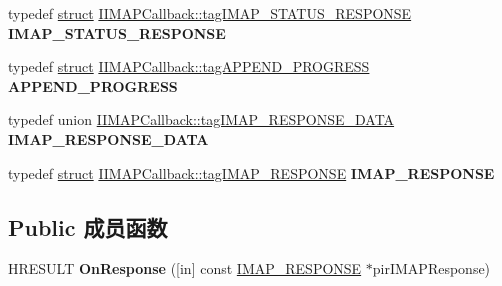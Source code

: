 \begin{DoxyCompactItemize}
\mbox{\label{interface_i_i_m_a_p_callback_aad87226fb7e9bc2c5a030ae23732c575}} 
typedef \hyperlink{interfacestruct}{struct} \hyperlink{struct_i_i_m_a_p_callback_1_1tag_i_m_a_p___s_t_a_t_u_s___r_e_s_p_o_n_s_e}{I\+I\+M\+A\+P\+Callback\+::tag\+I\+M\+A\+P\+\_\+\+S\+T\+A\+T\+U\+S\+\_\+\+R\+E\+S\+P\+O\+N\+SE} {\bfseries I\+M\+A\+P\+\_\+\+S\+T\+A\+T\+U\+S\+\_\+\+R\+E\+S\+P\+O\+N\+SE}
\item 
\mbox{\label{interface_i_i_m_a_p_callback_adf295f4f017536fabf12b58984b9ada8}} 
typedef \hyperlink{interfacestruct}{struct} \hyperlink{struct_i_i_m_a_p_callback_1_1tag_a_p_p_e_n_d___p_r_o_g_r_e_s_s}{I\+I\+M\+A\+P\+Callback\+::tag\+A\+P\+P\+E\+N\+D\+\_\+\+P\+R\+O\+G\+R\+E\+SS} {\bfseries A\+P\+P\+E\+N\+D\+\_\+\+P\+R\+O\+G\+R\+E\+SS}
\item 
\mbox{\label{interface_i_i_m_a_p_callback_a6c56aa535d7f333fbb47af1c7f5f3d94}} 
typedef union \hyperlink{union_i_i_m_a_p_callback_1_1tag_i_m_a_p___r_e_s_p_o_n_s_e___d_a_t_a}{I\+I\+M\+A\+P\+Callback\+::tag\+I\+M\+A\+P\+\_\+\+R\+E\+S\+P\+O\+N\+S\+E\+\_\+\+D\+A\+TA} {\bfseries I\+M\+A\+P\+\_\+\+R\+E\+S\+P\+O\+N\+S\+E\+\_\+\+D\+A\+TA}
\item 
\mbox{\label{interface_i_i_m_a_p_callback_a844454c8e08c6ae202147a34a7bf59dd}} 
typedef \hyperlink{interfacestruct}{struct} \hyperlink{struct_i_i_m_a_p_callback_1_1tag_i_m_a_p___r_e_s_p_o_n_s_e}{I\+I\+M\+A\+P\+Callback\+::tag\+I\+M\+A\+P\+\_\+\+R\+E\+S\+P\+O\+N\+SE} {\bfseries I\+M\+A\+P\+\_\+\+R\+E\+S\+P\+O\+N\+SE}
\end{DoxyCompactItemize}
\subsection*{Public 成员函数}
\begin{DoxyCompactItemize}
\item 
\mbox{\label{interface_i_i_m_a_p_callback_afd1770e315f954daaeca781d528671be}} 
H\+R\+E\+S\+U\+LT {\bfseries On\+Response} (\mbox{[}in\mbox{]} const \hyperlink{struct_i_i_m_a_p_callback_1_1tag_i_m_a_p___r_e_s_p_o_n_s_e}{I\+M\+A\+P\+\_\+\+R\+E\+S\+P\+O\+N\+SE} $\ast$pir\+I\+M\+A\+P\+Response)
\end{DoxyCompactItemize}
